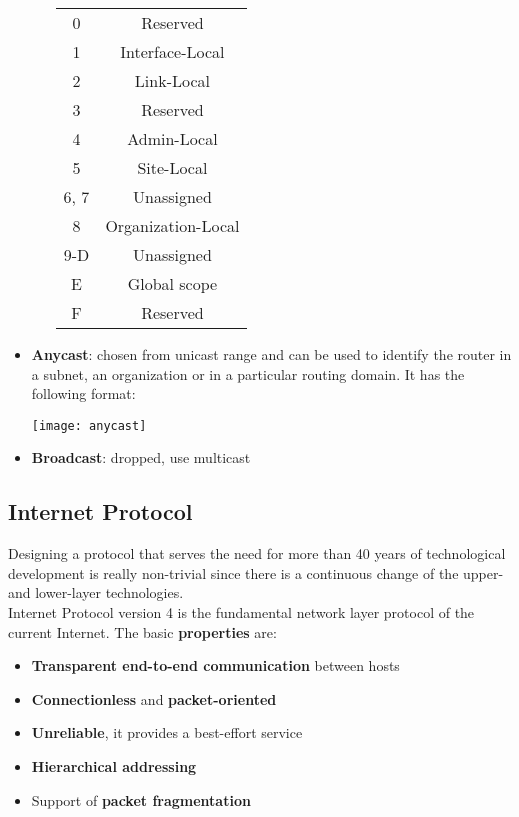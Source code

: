 \begin{itemize}
\begin{itemize}
\begin{table}[!h]
\begin{tabular}{c|c}
				\hline
				0 & Reserved \\
				1 & Interface-Local \\
				2 & Link-Local \\
				3 & Reserved \\
				4 & Admin-Local \\
				5 & Site-Local \\
				6, 7 & Unassigned \\
				8 & Organization-Local \\
				9-D & Unassigned \\
				E & Global scope \\
				F & Reserved
			\end{tabular}
		\end{table}
	\end{itemize}
	\item \textbf{Anycast}: chosen from unicast range and can be used to identify the router in a subnet, an organization or in a particular routing domain. It has the following format:
	\begin{center}
		\texttt{[image: anycast]}
	\end{center}
	\item \textbf{Broadcast}: dropped, use multicast
\end{itemize}

\newpage
\subsection{Internet Protocol}
Designing a protocol that serves the need for more than 40 years of technological development is really non-trivial since there is a continuous change of the upper- and lower-layer technologies.\\
Internet Protocol version 4 is the fundamental network layer protocol of the current Internet. The basic \textbf{properties} are:
\begin{itemize}
	\item \textbf{Transparent end-to-end communication} between hosts
	\item \textbf{Connectionless} and \textbf{packet-oriented}
	\item \textbf{Unreliable}, it provides a best-effort service
	\item \textbf{Hierarchical addressing}
	\item Support of \textbf{packet fragmentation}
\end{itemize}

